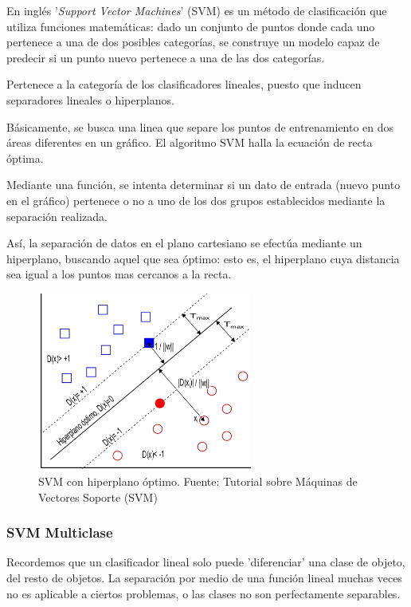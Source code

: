 \documentclass[a4paper,12pt,oneside,spanish]{book}
\begin{document}
En inglés '\textit{Support Vector Machines}' (SVM) es un método de clasificación que utiliza funciones matemáticas: dado un conjunto de puntos donde cada uno pertenece a una de dos posibles categorías, se construye un modelo capaz de predecir si un punto nuevo pertenece a una de las dos categorías.  \par

Pertenece a la categoría de los clasificadores lineales, puesto que inducen separadores lineales o hiperplanos. \par

Básicamente, se busca una linea que separe los puntos de entrenamiento en dos áreas diferentes en un gráfico. El algoritmo SVM halla la ecuación de recta óptima.\par

Mediante una función, se intenta determinar si un dato de entrada (nuevo punto en el gráfico) pertenece o no a uno de los dos grupos establecidos mediante la separación realizada. \par

Así, la separación de datos en el plano cartesiano se efectúa mediante un hiperplano, buscando aquel que sea óptimo: esto es, el hiperplano cuya distancia sea igual a los puntos mas cercanos a la recta.\par

\begin{figure}[h!]
	\includegraphics[width=200pt]{Imagenes/svm1.jpg}
	\centering
	\caption{SVM con hiperplano óptimo. Fuente: Tutorial sobre Máquinas de Vectores Soporte (SVM) \cite{svm1}}
	\label{fig:svm1}
\end{figure}

\subsubsection{SVM Multiclase}
Recordemos que un clasificador lineal solo puede 'diferenciar' una clase de objeto, del resto de objetos. La separación por medio de una función lineal muchas veces no es aplicable a ciertos problemas, o las clases no son perfectamente separables. \par
\end{document}
